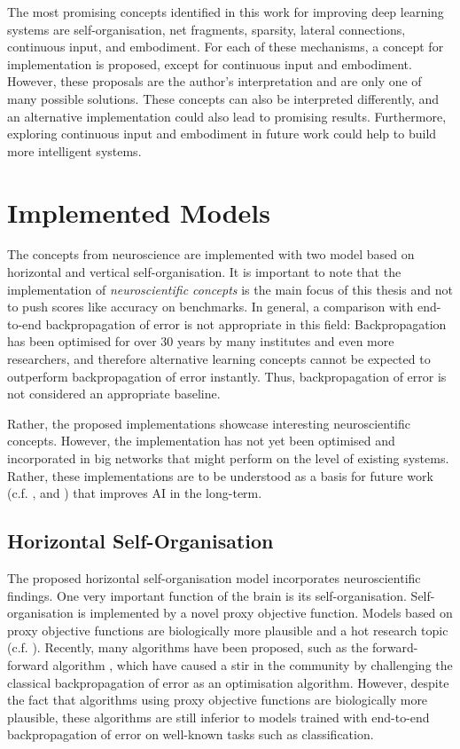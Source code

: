 The most promising concepts identified in this work for improving deep learning systems are self-organisation, net fragments, sparsity, lateral connections, continuous input, and embodiment. For each of these mechanisms, a concept for implementation is proposed, except for continuous input and embodiment. However, these proposals are the author's interpretation and are only one of many possible solutions. These concepts can also be interpreted differently, and an alternative implementation could also lead to promising results. Furthermore, exploring continuous input and embodiment in future work could help to build more intelligent systems. 


\section{Implemented Models}
The concepts from neuroscience are implemented with two model based on horizontal and vertical self-organisation. It is important to note that the implementation of \emph{neuroscientific concepts} is the main focus of this thesis and not to push scores like accuracy on benchmarks. In general, a comparison with end-to-end backpropagation of error is not appropriate in this field: Backpropagation has been optimised for over 30 years by many institutes and even more researchers, and therefore alternative learning concepts cannot be expected to outperform backpropagation of error instantly. Thus, backpropagation of error is not considered an appropriate baseline.

Rather, the proposed implementations showcase interesting neuroscientific concepts. However, the implementation has not yet been optimised and incorporated in big networks that might perform on the level of existing systems. Rather, these implementations are to be understood as a basis for future work (c.f. ,  and ) that improves AI in the long-term.


\subsection{Horizontal Self-Organisation}
The proposed horizontal self-organisation model incorporates neuroscientific findings. One very important function of the brain is its self-organisation. Self-organisation is implemented by a novel proxy objective function. Models based on proxy objective functions are biologically more plausible and a hot research topic (c.f. ). Recently, many algorithms have been proposed, such as the forward-forward algorithm , which have caused a stir in the community by challenging the classical backpropagation of error as an optimisation algorithm. However, despite the fact that algorithms using proxy objective functions are biologically more plausible, these algorithms are still inferior to models trained with end-to-end backpropagation of error on well-known tasks such as classification. 

